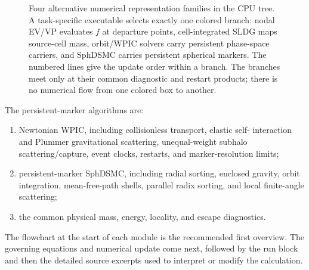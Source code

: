 \documentclass[11pt]{article}
\begin{document}
\begin{figure}[ht]
\caption{Four alternative numerical representation families in the CPU tree.
A task-specific executable selects exactly one colored branch: nodal EV/VP
evaluates \(f\) at departure points, cell-integrated SLDG maps source-cell
mass, orbit/WPIC solvers carry persistent phase-space carriers, and SphDSMC
carries persistent spherical markers.  The numbered lines give the update
order within a branch.  The branches meet only at their common diagnostic and
restart products; there is no numerical flow from one colored box to another.}
\label{fig:venus-algorithm-overview}
\end{figure}
\else
The persistent-marker algorithms are:
\begin{enumerate}
\item Newtonian WPIC, including collisionless transport, elastic self-
interaction and Plummer gravitational scattering, unequal-weight subhalo
scattering/capture, event clocks, restarts, and marker-resolution limits;
\item persistent-marker SphDSMC, including radial sorting, enclosed gravity,
orbit integration, mean-free-path shells, parallel radix sorting, and local
finite-angle scattering;
\item the common physical mass, energy, locality, and escape diagnostics.
\end{enumerate}
The flowchart at the start of each module is the recommended first overview.
The governing equations and numerical update come next, followed by the run
block and then the detailed source excerpts used to interpret or modify the
calculation.
\fi
\end{document}
